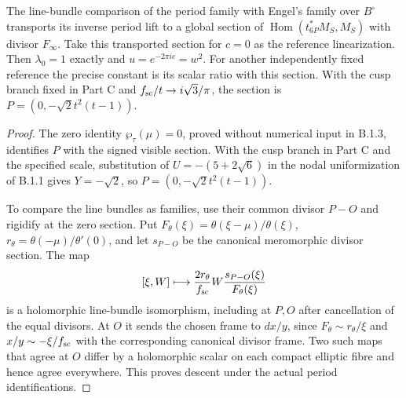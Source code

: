 \begin{proposition}[B.1.4; Proved]\label{st:B.1.4}
The line-bundle comparison of the period family with Engel's family over $B^\circ$ transports its inverse period lift to a global section of $\operatorname{Hom}(t_{6P}^*M_S,M_S)$ with divisor $F_\infty$. Take this transported section for $c=0$ as the reference linearization. Then $\lambda_0=1$ exactly and $u=e^{-2\pi ic}=w^2$. For another independently fixed reference the precise constant is its scalar ratio with this section. With the cusp branch fixed in Part C and $f_{\rm sc}/t\to i\sqrt3/\pi$, the section is $P=(0,-\sqrt2t^2(t-1))$.
\end{proposition}
\begin{proof}
The zero identity $\wp_\tau(\mu)=0$, proved without numerical input in B.1.3, identifies $P$ with the signed visible section. With the cusp branch in Part C and the specified scale, substitution of $U=-(5+2\sqrt6)$ in the nodal uniformization of B.1.1 gives $Y=-\sqrt2$, so $P=(0,-\sqrt2t^2(t-1))$.

To compare the line bundles as families, use their common divisor $P-O$ and rigidify at the zero section. Put $F_\theta(\xi)=\theta(\xi-\mu)/\theta(\xi)$, $r_\theta=\theta(-\mu)/\theta'(0)$, and let $s_{P-O}$ be the canonical meromorphic divisor section. The map
\[
 [\xi,W]\longmapsto\frac{2r_\theta}{f_{\rm sc}}
        W\frac{s_{P-O}(\xi)}{F_\theta(\xi)}
\]
is a holomorphic line-bundle isomorphism, including at $P,O$ after cancellation of the equal divisors. At $O$ it sends the chosen frame to $dx/y$, since $F_\theta\sim r_\theta/\xi$ and $x/y\sim-\xi/f_{\rm sc}$ with the corresponding canonical divisor frame. Two such maps that agree at $O$ differ by a holomorphic scalar on each compact elliptic fibre and hence agree everywhere. This proves descent under the actual period identifications.


\end{proof}
